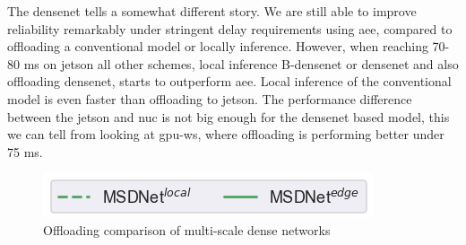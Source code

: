The \gls{densenet} tells a somewhat different story. We are still able to improve reliability remarkably under stringent delay requirements using \gls{aee}, compared to offloading a conventional model or locally inference. However, when reaching 70-80 ms on \gls{jetson} all other schemes, local inference B-\gls{densenet} or \gls{densenet} and also offloading \gls{densenet}, starts to outperform \gls{aee}. Local inference of the conventional model is even faster than offloading to \gls{jetson}. The performance difference between the \gls{jetson} and \gls{nuc} is not big enough for the \gls{densenet} based model, this we can tell from looking at \gls{gpu-ws}, where offloading is performing better under 75 ms. 

\begin{figure}
	\captionsetup[subfigure]{justification=centering, farskip=0pt,captionskip=0pt}
	\centering
	\includegraphics[width=.3\linewidth]{figures/edge/gpu_msdnet_offloading_vs_local_legend}
	\hfill
	\hfill
	\caption[Offloading comparison of multi-scale dense networks]{Offloading comparison of multi-scale dense networks}
	\label{fig:msdnet-offloading-vs-local}
\end{figure}

